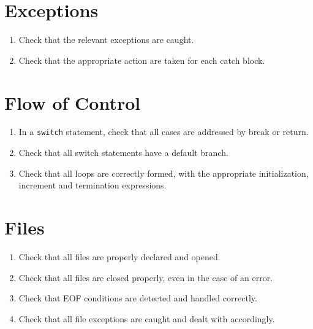 \section*{Exceptions}\begin{enumerate}[resume]
\item Check that the relevant exceptions are caught.
\item Check that the appropriate action are taken for each catch block.
\end{enumerate}

\section*{Flow of Control}\begin{enumerate}[resume]
\item In a \texttt{switch} statement, check that all cases are addressed by break or return.
\item Check that all switch statements have a default branch.
\item Check that all loops are correctly formed, with the appropriate initialization, increment and termination expressions.
\end{enumerate}

\section*{Files}\begin{enumerate}[resume]
\item Check that all files are properly declared and opened.
\item Check that all files are closed properly, even in the case of an error.
\item Check that EOF conditions are detected and handled correctly.
\item Check that all file exceptions are caught and dealt with accordingly.
\end{enumerate}
